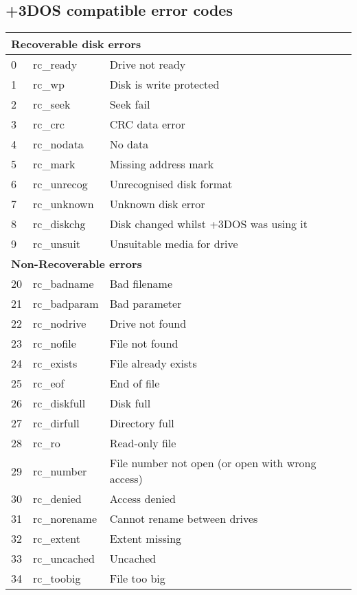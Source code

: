 \endgroup

\subsection{+3DOS compatible error codes}


\begingroup
\scriptsize
\begin{longtable}[ht]{ l l l }
  \hline
  \multicolumn{3}{l}{\normalsize\textbf{Recoverable disk errors}}\\
  \hline
  0 & rc\_ready & Drive not ready\\
  1 & rc\_wp & Disk is write protected\\
  2 & rc\_seek & Seek fail\\
  3 & rc\_crc & CRC data error\\
  4 & rc\_nodata & No data\\
  5 & rc\_mark & Missing address mark\\
  6 & rc\_unrecog & Unrecognised disk format\\
  7 & rc\_unknown & Unknown disk error\\
  8 & rc\_diskchg & Disk changed whilst +3DOS was using it\\
  9 & rc\_unsuit & Unsuitable media for drive\\
  \hline
  \multicolumn{3}{l}{\normalsize\textbf{Non-Recoverable errors}}\\
  \hline
  20 & rc\_badname & Bad filename\\
  21 & rc\_badparam & Bad parameter\\
  22 & rc\_nodrive & Drive not found\\
  23 & rc\_nofile & File not found\\
  24 & rc\_exists & File already exists\\
  25 & rc\_eof & End of file\\
  26 & rc\_diskfull & Disk full\\
  27 & rc\_dirfull & Directory full\\
  28 & rc\_ro & Read-only file\\
  29 & rc\_number & File number not open (or open with wrong access)\\
  30 & rc\_denied & Access denied\\
  31 & rc\_norename & Cannot rename between drives\\
  32 & rc\_extent & Extent missing\\
  33 & rc\_uncached & Uncached\\
  34 & rc\_toobig & File too big\\

\end{longtable}
